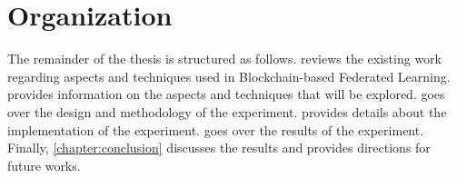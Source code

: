 \section{Organization}

The remainder of the thesis is structured as follows.  reviews the existing work regarding aspects and techniques used in Blockchain-based Federated Learning.  provides information on the aspects and techniques that will be explored.  goes over the design and methodology of the experiment.  provides details about the implementation of the experiment.  goes over the results of the experiment. Finally, \cref{chapter:conclusion} discusses the results and provides directions for future works.

